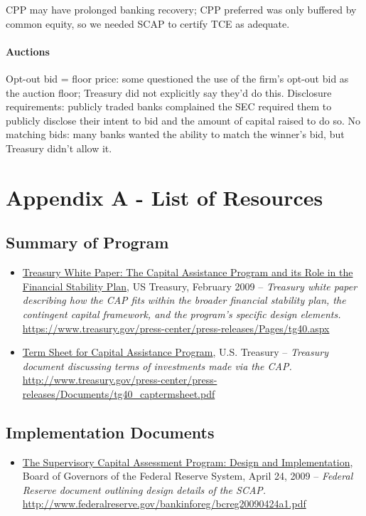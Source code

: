 \documentclass[12pt]{article}
\begin{document}
CPP may have prolonged banking recovery; CPP preferred was only buffered by common equity, so we needed SCAP to certify TCE as adequate. 

\paragraph{Auctions}

Opt-out bid = floor price:  some questioned the use of the firm's opt-out bid as the auction floor; Treasury did not explicitly say they'd do this. 
Disclosure requirements: publicly traded banks complained the SEC required them to publicly disclose their intent to bid and the amount of capital raised to do so.
No matching bids: many banks wanted the ability to match the winner's bid, but Treasury didn't allow it.




\nocite{*}


\section{Appendix A - List of Resources}

\subsection{Summary of Program}

\begin{itemize}

\item
\ul{Treasury White Paper: The Capital Assistance Program and its Role in the Financial Stability Plan}, US Treasury, February 2009 -- \emph{Treasury white paper describing how the CAP fits within the broader financial stability plan, the contingent capital framework, and the program's specific design elements.} \url{https://www.treasury.gov/press-center/press-releases/Pages/tg40.aspx}
\item
\ul{Term
  Sheet for Capital Assistance Program}, U.S. Treasury -- \emph{Treasury
  document discussing terms of investments made via the CAP.} \url{http://www.treasury.gov/press-center/press-releases/Documents/tg40_captermsheet.pdf}
\end{itemize}

\subsection{Implementation Documents}
\begin{itemize}
\item
\ul{The
  Supervisory Capital Assessment Program: Design and Implementation},
  Board of Governors of the Federal Reserve System, April 24, 2009 -- \emph{Federal Reserve document outlining design details of the SCAP.} \url{http://www.federalreserve.gov/bankinforeg/bcreg20090424a1.pdf}
\end{itemize}
\end{document}
